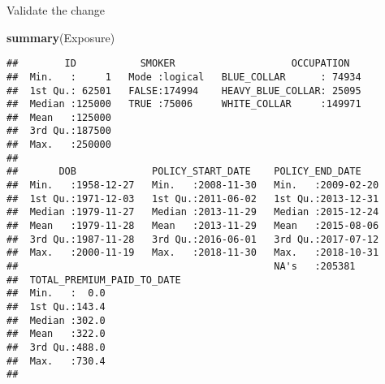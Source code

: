 \documentclass[]{article}
\newenvironment{Shaded}{\begin{snugshade}}{\end{snugshade}}
\newcommand{\KeywordTok}[1]{\textcolor[rgb]{0.13,0.29,0.53}{\textbf{#1}}}
\newcommand{\DataTypeTok}[1]{\textcolor[rgb]{0.13,0.29,0.53}{#1}}
\newcommand{\DecValTok}[1]{\textcolor[rgb]{0.00,0.00,0.81}{#1}}
\newcommand{\StringTok}[1]{\textcolor[rgb]{0.31,0.60,0.02}{#1}}
\newcommand{\NormalTok}[1]{#1}
\begin{document}
\begin{Shaded}
\end{Shaded}

Validate the change

\begin{Shaded}
\begin{Highlighting}[]
\KeywordTok{summary}\NormalTok{(Exposure)}
\end{Highlighting}
\end{Shaded}

\begin{verbatim}
##        ID           SMOKER                    OCCUPATION    
##  Min.   :     1   Mode :logical   BLUE_COLLAR      : 74934  
##  1st Qu.: 62501   FALSE:174994    HEAVY_BLUE_COLLAR: 25095  
##  Median :125000   TRUE :75006     WHITE_COLLAR     :149971  
##  Mean   :125000                                             
##  3rd Qu.:187500                                             
##  Max.   :250000                                             
##                                                             
##       DOB             POLICY_START_DATE    POLICY_END_DATE     
##  Min.   :1958-12-27   Min.   :2008-11-30   Min.   :2009-02-20  
##  1st Qu.:1971-12-03   1st Qu.:2011-06-02   1st Qu.:2013-12-31  
##  Median :1979-11-27   Median :2013-11-29   Median :2015-12-24  
##  Mean   :1979-11-28   Mean   :2013-11-29   Mean   :2015-08-06  
##  3rd Qu.:1987-11-28   3rd Qu.:2016-06-01   3rd Qu.:2017-07-12  
##  Max.   :2000-11-19   Max.   :2018-11-30   Max.   :2018-10-31  
##                                            NA's   :205381      
##  TOTAL_PREMIUM_PAID_TO_DATE
##  Min.   :  0.0             
##  1st Qu.:143.4             
##  Median :302.0             
##  Mean   :322.0             
##  3rd Qu.:488.0             
##  Max.   :730.4             
## 
\end{verbatim}
\end{document}
